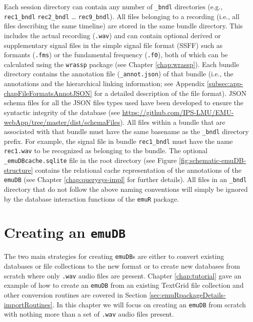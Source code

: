 \documentclass[]{book}
\begin{document}
Each session directory can contain any number of \texttt{\_bndl} directories (e.g., \texttt{rec1\_bndl} \texttt{rec2\_bndl} \ldots{} \texttt{rec9\_bndl}). All files belonging to a recording (i.e., all files describing the same timeline) are stored in the same bundle directory. This includes the actual recording (\texttt{.wav}) and can contain optional derived or supplementary signal files in the simple signal file format (SSFF) \citep{cassidy:2013a} such as formants (\texttt{.fms}) or the fundamental frequency (\texttt{.f0}), both of which can be calculated using the \texttt{wrassp} package (see Chapter \ref{chap:wrassp}). Each bundle directory contains the annotation file (\texttt{\_annot.json}) of that bundle (i.e., the annotations and the hierarchical linking information; see Appendix \ref{subsec:app-chapFileFormatsAnnotJSON} for a detailed description of the file format). JSON schema files for all the JSON files types used have been developed to ensure the syntactic integrity of the database (see \url{https://github.com/IPS-LMU/EMU-webApp/tree/master/dist/schemaFiles}). All files within a bundle that are associated with that bundle must have the same basename as the \texttt{\_bndl} directory prefix. For example, the signal file in bundle \texttt{rec1\_bndl} must have the name \texttt{rec1.wav} to be recognized as belonging to the bundle. The optional \texttt{\_emuDBcache.sqlite} file in the root directory (see Figure \ref{fig:schematic-emuDB-structure} contains the relational cache representation of the annotations of the \texttt{emuDB} (see Chapter \ref{chap:querysys-impl} for further details). All files in an \texttt{\_bndl} directory that do not follow the above naming conventions will simply be ignored by the database interaction functions of the \texttt{emuR} package.

\hypertarget{creating-an-emudb}{%
\section{\texorpdfstring{Creating an \texttt{emuDB}}{Creating an emuDB}}\label{creating-an-emudb}}

The two main strategies for creating \texttt{emuDB}s are either to convert existing databases or file collections to the new format or to create new databases from scratch where only \texttt{.wav} audio files are present. Chapter \ref{chap:tutorial} gave an example of how to create an \texttt{emuDB} from an existing TextGrid file collection and other conversion routines are covered in Section \ref{sec:emuRpackageDetails-importRoutines}. In this chapter we will focus on creating an \texttt{emuDB} from scratch with nothing more than a set of \texttt{.wav} audio files present.
\end{document}
